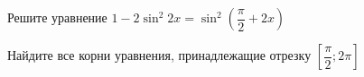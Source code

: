 \begin{ex}
	\begin{condition}
		\begin{enumcols}[label=\asbuk*)]
			\item Решите уравнение \( 1 - 2\sin^2 2x = \sin^2{\left(\dfrac{\pi}{2}+2x\right)} \)
			\item Найдите все корни уравнения, принадлежащие отрезку \( \left[\dfrac{\pi}{2};2\pi\right] \)
		\end{enumcols}
	\end{condition}
\end{ex}